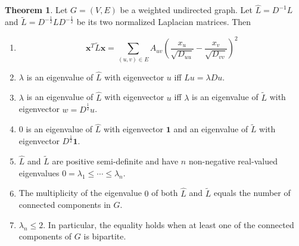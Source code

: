 \documentclass[a4paper]{article}
\theoremstyle{definition}
\newtheorem{theorem}{Theorem}[section]
\begin{document}
\begin{theorem}
Let $G=(V, E)$ be a weighted undirected graph. Let $\hat{L}=D^{-1}L$ and $\tilde{L}=D^{-\frac{1}{2}}LD^{-\frac{1}{2}}$ be its two normalized Laplacian matrices. Then
\begin{enumerate}
    \item \begin{equation} \textbf{x}^{T}\tilde{L}\textbf{x} = \sum_{(u, v)\in E} A_{uv} \left(\frac{x_u}{\sqrt{D_{uu}}}-\frac{x_v}{\sqrt{D_{vv}}}\right)^2 \end{equation}
    \item $\lambda$ is an eigenvalue of $\hat{L}$ with eigenvector $u$ iff $Lu=\lambda Du$.
    \item $\lambda$ is an eigenvalue of $\hat{L}$ with eigenvector $u$ iff $\lambda$ is an eigenvalue of $\tilde{L}$ with eigenvector $w=D^{\frac{1}{2}}u$.
    \item $0$ is an eigenvalue of $\hat{L}$ with eigenvector $\textbf{1}$ and an eigenvalue of $\tilde{L}$ with eigenvector $D^{\frac{1}{2}}\textbf{1}$.
    \item $\hat{L}$ and $\tilde{L}$ are positive semi-definite and have $n$ non-negative real-valued eigenvalues $0=\lambda_1\leq \cdots\leq \lambda_n$.
    \item The multiplicity of the eigenvalue $0$ of both $\hat{L}$ and $\tilde{L}$ equals the number of connected components in $G$.
    \item $\lambda_n\leq 2$. In particular, the equality holds when at least one of the connected components of $G$ is bipartite.
\end{enumerate}
\end{theorem}
\end{document}
